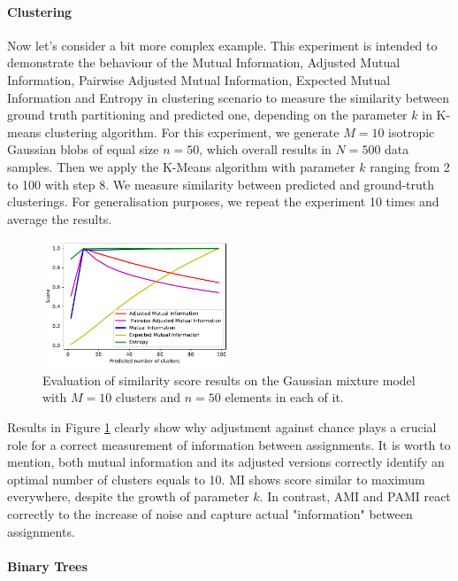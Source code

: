 \paragraph{Clustering}
Now let's consider a bit more complex example. This experiment is intended to demonstrate the behaviour of the Mutual Information, Adjusted Mutual Information, Pairwise Adjusted Mutual Information, Expected Mutual Information and Entropy in clustering scenario to measure the similarity between ground truth partitioning and predicted one, depending on the parameter $k$ in K-means clustering algorithm. 
For this experiment, we generate $M=10$ isotropic Gaussian blobs of equal size $n=50$, which overall results in $N=500$ data samples. Then we apply the K-Means algorithm with parameter $k$ ranging from 2 to 100 with step 8. We measure similarity between predicted and ground-truth clusterings. For generalisation purposes, we repeat the experiment 10 times and average the results. 

\begin{figure}[H]
	\begin{center}
		\includegraphics[width=0.5\textwidth]{figures/4-kmeans.pdf}
		\caption{Evaluation of similarity score results on the Gaussian mixture model with $M=10$ clusters and $n=50$ elements in each of it.}
		\label{fig:k_means}
	\end{center}
\end{figure}

Results in Figure \ref{fig:k_means} clearly show why adjustment against chance plays a crucial role for a correct measurement of information between assignments. It is worth to mention, both mutual information and its adjusted versions correctly identify an optimal number of clusters equals to 10. MI shows score similar to maximum everywhere, despite the growth of parameter $k$. In contrast, AMI and PAMI react correctly to the increase of noise and capture actual "information" between assignments. 

\paragraph{Binary Trees}

